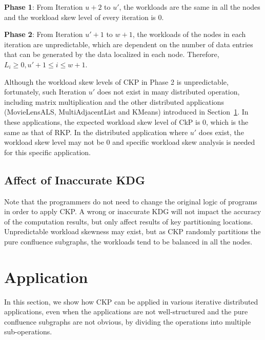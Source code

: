 \documentclass[10pt,journal,compsoc]{IEEEtran}
\begin{document}
\textbf{Phase 1}: From Iteration $u+2$ to $u'$, 
the workloads are the same in all the nodes and the workload skew level of every iteration is 0.

\textbf{Phase 2}: From Iteration $u'+1$ to $w+1$, 
the workloads of the nodes in each iteration are unpredictable, 
which are dependent on the number of data entries that can be generated by the data localized in each node. Therefore, $L_i \geq 0, u'+1 \leq i \leq w+1$.

Although the workload skew levels of CKP in Phase 2 is unpredictable,
fortunately, such Iteration $u'$ does not exist in many distributed operation, 
including matrix multiplication and the other distributed applications (MovieLensALS, MultiAdjacentList and KMeans) introduced in Section~\ref{section:application}. 
In these applications, the expected workload skew level of CkP is 0, which is the same as that of RKP.
In the distributed application where $u'$ does exist, the workload skew level may not be 0 and specific workload skew analysis is needed for this specific application.


\subsection{Affect of Inaccurate KDG}
Note that the programmers do not need to change the original logic of programs 
in order to apply CKP. 
A wrong or inaccurate KDG will not impact the accuracy of the computation results, but only affect results of key partitioning locations. 
Unpredictable workload skewness may exist, but as CKP randomly partitions the pure confluence subgraphs, the workloads tend to be balanced in all the nodes. 




\section{Application}\label{section:application}
In this section, we show how CKP can be applied in various
iterative distributed applications, even when the applications are not well-structured and the pure confluence subgraphs
are not obvious, by dividing the operations into multiple sub-operations.
\end{document}
